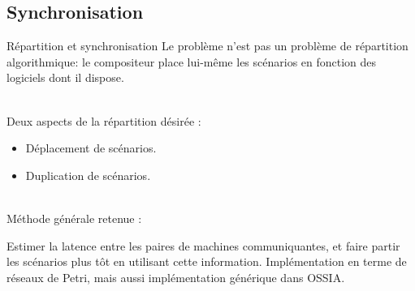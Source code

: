 \subsection{Synchronisation}
\begin{frame}{Répartition et synchronisation}
	Le problème n'est pas un problème de répartition algorithmique:
	le compositeur place lui-même les scénarios en fonction des logiciels dont il dispose.
	
	~ \\
	Deux aspects de la répartition désirée : 
	\begin{itemize}
		\item Déplacement de scénarios.
		\item Duplication de scénarios. 
	\end{itemize}
	~ \\

	Méthode générale retenue : 
	\begin{itemize}
		\itemar Estimer la latence entre les paires de machines communiquantes, et faire partir les scénarios plus tôt en utilisant cette information.
		\itemar Implémentation en terme de réseaux de Petri, mais aussi implémentation générique dans \textsc{OSSIA}.
	\end{itemize}
\end{frame}
